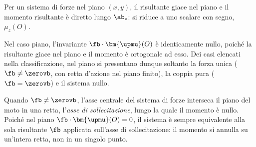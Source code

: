 Per un sistema di forze nel piano $(x,y)$, il risultante
giace nel piano e il momento risultante è diretto lungo
$\ab_z$: si riduce a uno scalare con segno, $\mu_z(O)$.

%
%

\medskip

	Nel caso piano, l'invariante
	$\fb \cdot \bm{\upmu}(O)$ è identicamente nullo, poiché
	la risultante giace nel piano e il momento è ortogonale ad
	esso. Dei casi elencati nella classificazione, nel piano si
	presentano dunque soltanto la forza unica
	($\fb \neq \zerovb$, con retta d'azione nel piano finito),
	la coppia pura ($\fb = \zerovb$) e il sistema nullo. 


\medskip


Quando $\fb \neq \zerovb$, l'asse centrale del sistema di
forze interseca il piano del moto in una retta, l'\textit{asse
	di sollecitazione}, lungo la quale il momento è nullo. Poiché
nel piano $\fb \cdot \bm{\upmu}(O) = 0$, il sistema è sempre
equivalente alla sola risultante $\fb$ applicata sull'asse di
sollecitazione: il momento si annulla su un'intera retta, non
in un singolo punto.

